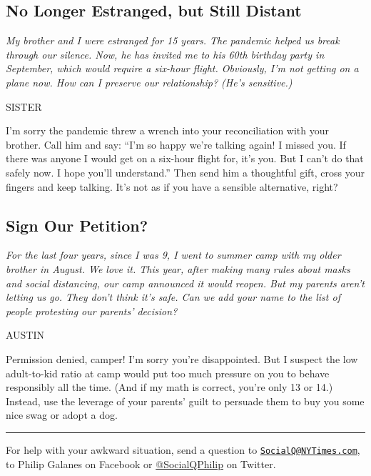 \hypertarget{no-longer-estranged-but-still-distant}{%
\subsection{No Longer Estranged, but Still
Distant}\label{no-longer-estranged-but-still-distant}}

\emph{My brother and I were estranged for 15 years. The pandemic helped
us break through our silence. Now, he has invited me to his 60th
birthday party in September, which would require a six-hour flight.
Obviously, I'm not getting on a plane now. How can I preserve our
relationship? (He's sensitive.)}

SISTER

I'm sorry the pandemic threw a wrench into your reconciliation with your
brother. Call him and say: ``I'm so happy we're talking again! I missed
you. If there was anyone I would get on a six-hour flight for, it's you.
But I can't do that safely now. I hope you'll understand.'' Then send
him a thoughtful gift, cross your fingers and keep talking. It's not as
if you have a sensible alternative, right?

\hypertarget{sign-our-petition}{%
\subsection{Sign Our Petition?}\label{sign-our-petition}}

\emph{For the last four years, since I was 9, I went to summer camp with
my older brother in August. We love it. This year, after making many
rules about masks and social distancing, our camp announced it would
reopen. But my parents aren't letting us go. They don't think it's safe.
Can we add your name to the list of people protesting our parents'
decision?}

AUSTIN

Permission denied, camper! I'm sorry you're disappointed. But I suspect
the low adult-to-kid ratio at camp would put too much pressure on you to
behave responsibly all the time. (And if my math is correct, you're only
13 or 14.) Instead, use the leverage of your parents' guilt to persuade
them to buy you some nice swag or adopt a dog.

\begin{center}\rule{0.5\linewidth}{\linethickness}\end{center}

For help with your awkward situation, send a question to
\href{mailto:SocialQ@NYTimes.com}{\nolinkurl{SocialQ@NYTimes.com}}, to
Philip Galanes on Facebook or
\href{https://twitter.com/SocialQPhilip}{@SocialQPhilip} on Twitter.

